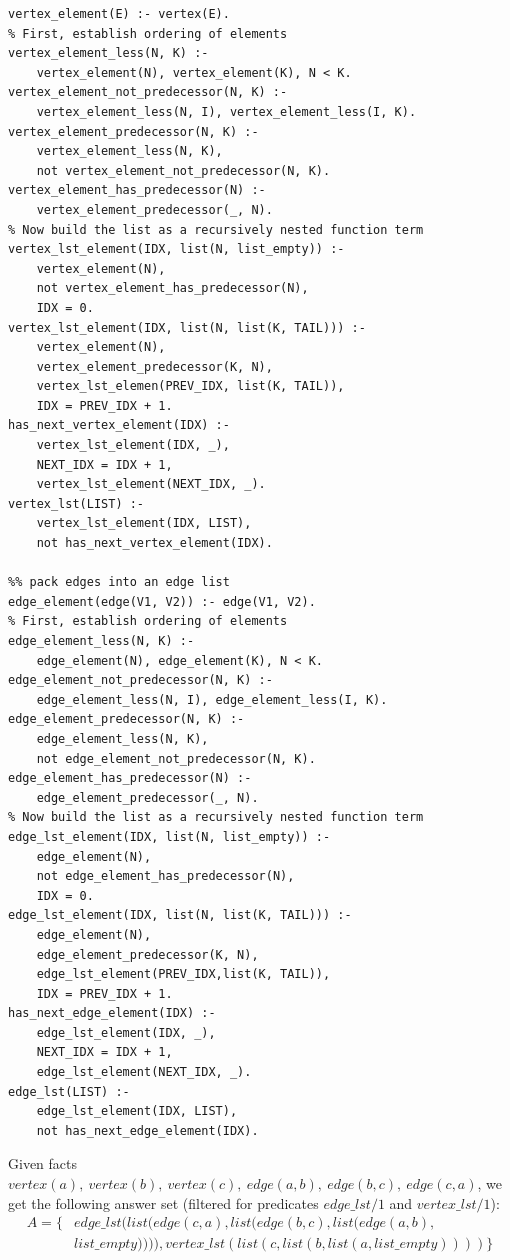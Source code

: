 \begin{lstlisting}[style=asp-code, label={lst:graph-list-aggregation}, caption={ASP code to create vertex and edge lists for a given graph.}]
%% pack vertices into a vertex list
vertex_element(E) :- vertex(E).
% First, establish ordering of elements
vertex_element_less(N, K) :- 
    vertex_element(N), vertex_element(K), N < K.
vertex_element_not_predecessor(N, K) :- 
    vertex_element_less(N, I), vertex_element_less(I, K).
vertex_element_predecessor(N, K) :- 
    vertex_element_less(N, K), 
    not vertex_element_not_predecessor(N, K).
vertex_element_has_predecessor(N) :- 
    vertex_element_predecessor(_, N).
% Now build the list as a recursively nested function term
vertex_lst_element(IDX, list(N, list_empty)) :- 
    vertex_element(N), 
    not vertex_element_has_predecessor(N), 
    IDX = 0.
vertex_lst_element(IDX, list(N, list(K, TAIL))) :- 
    vertex_element(N), 
    vertex_element_predecessor(K, N), 
    vertex_lst_elemen(PREV_IDX, list(K, TAIL)), 
    IDX = PREV_IDX + 1.
has_next_vertex_element(IDX) :- 
    vertex_lst_element(IDX, _), 
    NEXT_IDX = IDX + 1, 
    vertex_lst_element(NEXT_IDX, _).
vertex_lst(LIST) :- 
    vertex_lst_element(IDX, LIST), 
    not has_next_vertex_element(IDX).

%% pack edges into an edge list
edge_element(edge(V1, V2)) :- edge(V1, V2).
% First, establish ordering of elements
edge_element_less(N, K) :- 
    edge_element(N), edge_element(K), N < K.
edge_element_not_predecessor(N, K) :- 
    edge_element_less(N, I), edge_element_less(I, K).
edge_element_predecessor(N, K) :- 
    edge_element_less(N, K), 
    not edge_element_not_predecessor(N, K).
edge_element_has_predecessor(N) :- 
    edge_element_predecessor(_, N).
% Now build the list as a recursively nested function term
edge_lst_element(IDX, list(N, list_empty)) :- 
    edge_element(N), 
    not edge_element_has_predecessor(N), 
    IDX = 0.
edge_lst_element(IDX, list(N, list(K, TAIL))) :- 
    edge_element(N), 
    edge_element_predecessor(K, N), 
    edge_lst_element(PREV_IDX,list(K, TAIL)), 
    IDX = PREV_IDX + 1.
has_next_edge_element(IDX) :- 
    edge_lst_element(IDX, _), 
    NEXT_IDX = IDX + 1, 
    edge_lst_element(NEXT_IDX, _).
edge_lst(LIST) :- 
    edge_lst_element(IDX, LIST), 
    not has_next_edge_element(IDX).
\end{lstlisting} 
Given facts $vertex(a),~vertex(b),~vertex(c),~edge(a,b),~edge(b,c),~edge(c,a)$, we get the following answer set (filtered for predicates $edge\_lst/1$ and $vertex\_lst/1$):
\begin{align*}
    A = \{&edge\_lst(list(edge(c,a), list(edge(b,c), list(edge(a,b), \\
           &list\_empty)))), vertex\_lst(list(c, list(b,list(a,list\_empty))))\}
\end{align*}    

